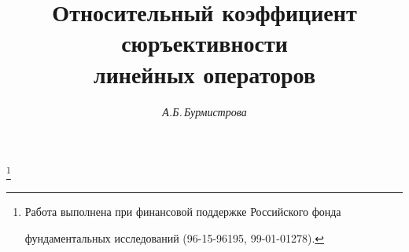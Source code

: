

 




 


\newcommand{\tts}[1]{} 


 




  


\setcounter{page}{19} 












 


\author{\it А.Б.\,Бурмистрова} 




\title{Относительный коэффициент сюръективности\\ 


линейных операторов} 


\thanks{Работа выполнена при финансовой поддержке Российского фонда  


фундаментальных исследований (96-15-96195, 99-01-01278).} 


 


\date{} 




\pagestyle{plain} %


 




